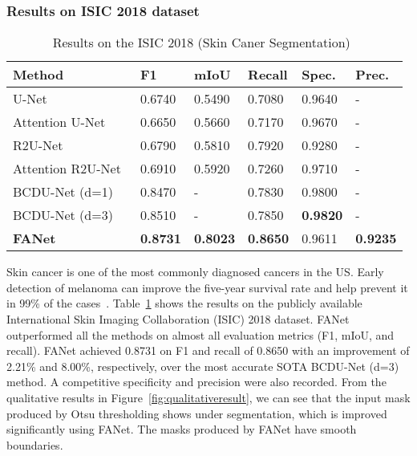 \documentclass[journal]{IEEEtran}
\begin{document}
\subsubsection{Results on ISIC 2018 dataset}
\begin{table}[!t]
\footnotesize
\centering
\caption{Results on the ISIC 2018 (Skin Caner Segmentation)~\cite{codella2018skin,tschandl2018ham10000}}
\vspace{0.1cm}
\begin{tabular}{@{}l|l|l|l|l|l@{}}
\toprule
\textbf{Method} & \textbf{F1} & \textbf{mIoU }& \textbf{Recall}& \textbf{Spec.} & \textbf{Prec.} \\ 
\hline
\hline
U-Net~\cite{ronneberger2015u} & 0.6740  & 0.5490 & 0.7080 & 0.9640 & -    \\ Attention U-Net~\cite{oktay2018attention} & 0.6650  & 0.5660 & 0.7170 & 0.9670 & -    \\ R2U-Net~\cite{alom2018recurrent} & 0.6790  & 0.5810 & 0.7920 & 0.9280 & -    \\ Attention R2U-Net~\cite{alom2018recurrent} &  0.6910  & 0.5920 & 0.7260 & 0.9710 & -    \\ BCDU-Net (d=1)~\cite{azad2019bi} & 0.8470  & - & 0.7830 & 0.9800 & -    \\ BCDU-Net (d=3)~\cite{azad2019bi} & 0.8510  & -  & 0.7850 & \textbf{0.9820} & -       \\ \textbf{FANet} & \textbf{0.8731} & \textbf{0.8023} & \textbf{0.8650} & 0.9611 & \textbf{0.9235} \\ \bottomrule
\end{tabular}
\label{tab:ISIC2018}
\end{table}

Skin cancer is one of the most commonly diagnosed cancers in the US. Early detection of melanoma can improve the five-year survival rate and help prevent it in 99\% of the cases~\cite{cancerfigures}. Table~\ref{tab:ISIC2018} shows the results on the publicly available International Skin Imaging Collaboration (ISIC) 2018 dataset. FANet outperformed all the methods on almost all evaluation metrics (F1, mIoU, and recall). FANet achieved 0.8731 on F1 and recall of 0.8650 with an improvement of 2.21\% and 8.00\%, respectively, over the most accurate \ac{SOTA} BCDU-Net (d=3) method. A competitive specificity and precision were also recorded. From the qualitative results in Figure~\ref{fig:qualitativeresult}, we can see that the input mask produced by Otsu thresholding shows under segmentation, which is improved significantly using FANet. The masks produced by FANet have smooth boundaries. 
\end{document}
